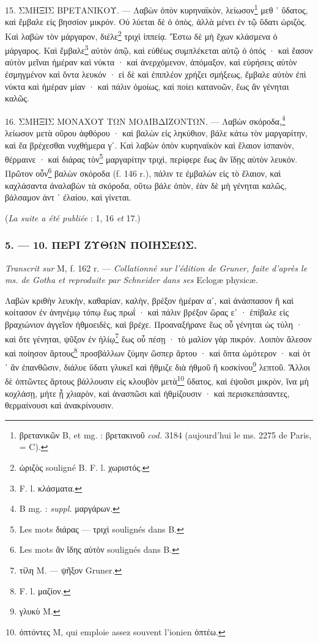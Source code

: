 \documentclass[a4paper, 11pt, oneside, polutonikogreek, french]{article}
\begin{document}
15. ΣΜΗΞΙΣ ΒΡΕΤΑΝΙΚΟΥ. --- Λαβὼν ὀπὸν κυρηναϊκὸν, λείωσον\footnote{βρετανικῶν B, et mg. : βρετακινοῦ \emph{cod.} 3184 (aujourd'hui le ms. 2275 de Paris, = C).} μεθ ᾽ ὕδατος, καὶ ἔμβαλε εἰς βησσίον μικρόν. Οὐ λύεται δὲ ὁ ὀπὸς, ἀλλὰ μένει ἐν τῷ ὕδατι ὡριζός. Καὶ λαβὼν τὸν μάργαρον, διέλε\footnote{ὡριζὸς souligné B. F. l. χωριστός.} τριχὶ ἱππείᾳ. Ἔστω δὲ μὴ ἔχων κλάσμενα ὁ μάργαρος. Καὶ ἔμβαλε\footnote{F. l. κλάσματα.} αὐτὸν ὀπῷ, καὶ εὐθέως συμπλέκεται αὐτῷ ὁ ὀπός · καὶ ἔασον αὐτὸν μεῖναι ἡμέραν καὶ νύκτα · καὶ ἀνερχόμενον, ἀπόμαξον, καὶ εὑρήσεις αὐτὸν ἐσμηγμένον καὶ ὄντα λευκόν · εἰ δὲ καὶ ἐπιπλέον χρήζει σμήξεως, ἔμβαλε αὐτὸν ἐπὶ νύκτα καὶ ἡμέραν μίαν · καὶ πάλιν ὁμοίως, καὶ ποίει κατανοῶν, ἕως ἂν γένηται καλῶς.

16. ΣΜΗΞΙΣ ΜΟΝΑΧΟΥ ΤΩΝ ΜΟΛΙΒΔΙΖΟΝΤΩΝ. --- Λαβὼν σκόροδα,\footnote{B mg. : \emph{suppl.} μαργάρων.} λείωσον μετὰ οὔρου ἀφθόρου · καὶ βαλὼν εἰς ληκύθιον, βάλε κάτω τὸν μαργαρίτην, καὶ ἔα βρέχεσθαι νυχθήμερα γʹ. Καὶ λαβὼν ὀπὸν κυρηναϊκὸν καὶ ἔλαιον ἰσπανὸν, θέρμαινε · καὶ διάρας τὸν\footnote{Les mots διάρας --- τριχὶ soulignés dans B.} μαργαρίτην τριχὶ, περίφερε ἕως ἂν ἴδῃς αὐτὸν λευκόν. Πρῶτον οὖν\footnote{Les mots ἂν ἴδης αὐτὸν soulignés dans B.} βαλὼν σκόροδα (f. 146 r.), πάλιν τε ἐμβαλὼν εἰς τὸ ἔλαιον, καὶ καχλάσαντα ἀναλαβὼν τὰ σκόροδα, οὕτω βάλε ὀπὸν, ἐὰν δὲ μὴ γένηται καλῶς, βάλσαμον ἀντ ᾽ ἐλαίου, καὶ γίνεται.

(\emph{La suite a été publiée} : 1, 16 \emph{et} 17.)

\bigskip
\centerline{\EightStarTaper}
\centerline{\EightStarTaper\EightStarTaper}
\bigskip

\subsubsection{5. --- 10. ΠΕΡΙ ΖΥΘΩΝ ΠΟΙΗΣΕΩΣ.}

\emph{Transcrit sur} M, f. 162 r. --- \emph{Collationné sur l'édition de Gruner, faite d'après le ms. de Gotha et reproduite par Schneider dans ses} Eclogæ physicæ.

\bigskip

Λαβὼν κριθὴν λευκὴν, καθαρίαν, καλὴν, βρέξον ἡμέραν αʹ, καὶ ἀνάσπασον ἢ καὶ κοίτασον ἐν ἀνηνέμῳ τόπῳ ἕως πρωΐ · καὶ πάλιν βρέξον ὥρας εʹ · ἐπίβαλε εἰς βραχιώνιον ἀγγεῖον ἠθμοειδὲς, καὶ βρέχε. Προαναξήρανε ἕως οὗ γένηται ὡς τύλη · καὶ ὅτε γένηται, ψῦξον ἐν ἡλίῳ\footnote{τίλη M. --- ψῆξον Gruner.} ἕως οὗ πέσῃ · τὸ μαλίον γὰρ πικρόν. Λοιπὸν ἄλεσον καὶ ποίησον ἄρτους\footnote{F. l. μαζίον.} προσβάλλων ζύμην ὥσπερ ἄρτου · καὶ ὄπτα ὠμότερον · καὶ ὁτ ᾽ ἂν ἐπανθῶσιν, διάλυε ὕδατι γλυκεῖ καὶ ἤθμιζε διὰ ἠθμοῦ ἢ κοσκίνου\footnote{γλυκὺ M.} λεπτοῦ. Ἄλλοι δὲ ὀπτῶντες ἄρτους βάλλουσιν εἰς κλουβὸν μετὰ\footnote{ὀπτόντες M, qui emploie assez souvent l'ionien ὀπτέω.} ὕδατος, καὶ ἑψοῦσι μικρὸν, ἵνα μὴ κοχλάσῃ, μήτε ᾖ χλιαρὸν, καὶ ἀνασπῶσι καὶ ἠθμίζουσιν · καὶ περισκεπάσαντες, θερμαίνουσι καὶ ἀνακρίνουσιν.
\end{document}
